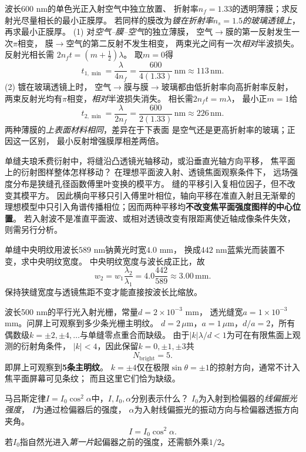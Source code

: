 \problemtext 波长$600$ nm的单色光正入射空气中独立放置、
折射率$n_f=1.33$的透明薄膜；求反射光尽量相长的最小正膜厚。
若同样的膜改为\emph{镀在折射率$n_s=1.5$的玻璃透镜上}，
再求最小正膜厚。
\workings
(1) 对\emph{空气--膜--空气}的独立薄膜，
空气$\to$膜的第一反射发生一次$\pi$相变，
膜$\to$空气的第二反射不发生相变，
两束光之间有一次\emph{相对}半波损失。
反射光相长需
$2n_ft=(m+\tfrac12)\lambda$。
取$m=0$得
\[
\boxed{t_{1,\min}=\frac{\lambda}{4n_f}
=\frac{600}{4(1.33)}\,\mathrm{nm}\approx113\,\mathrm{nm}}.
\]
(2) 镀在玻璃透镜上时，
空气$\to$膜与膜$\to$玻璃都由低折射率向高折射率反射，
两束反射光均有$\pi$相变，\emph{相对}半波损失消失。
相长需$2n_ft=m\lambda$，
最小正$m=1$给
\[
\boxed{t_{2,\min}=\frac{\lambda}{2n_f}
=\frac{600}{2(1.33)}\,\mathrm{nm}\approx226\,\mathrm{nm}}.
\]
\crosscheck 两种薄膜的\emph{上表面材料相同}，差异在于下表面
是空气还是更高折射率的玻璃；正因这一区别，
最小反射增强膜厚相差两倍。

\problemtext 单缝夫琅禾费衍射中，将缝沿凸透镜光轴移动，或沿垂直光轴方向平移，
焦平面上的衍射图样整体怎样移动？
\workings
在理想平面波入射、透镜焦面观察条件下，
远场强度分布是狭缝孔径函数傅里叶变换的模平方。
缝的平移引入复相位因子，但不改变其模平方。
因此横向平移只引入傅里叶相位，轴向平移在准直入射且无渐晕的理想模型中只引入角谱传播相位；因而两种平移均\textbf{不改变焦平面强度图样的中心位置}。
\crosscheck 若入射波不是准直平面波、或相对透镜改变有限距离使近轴成像条件失效，则需另行分析。

\problemtext 单缝中央明纹用波长$589$ nm钠黄光时宽$4.0$ mm，
换成$442$ nm蓝紫光而装置不变，求中央明纹宽度。
\workings
中央明纹宽度与波长成正比，故
\[
\boxed{w_2=w_1\frac{\lambda_2}{\lambda_1}
=4.0\frac{442}{589}\approx3.00\,\mathrm{mm}}.
\]
\crosscheck 保持狭缝宽度与透镜焦距不变才能直接按波长比缩放。

\problemtext 波长500 nm的平行光入射光栅，常量$d=2\times10^{-3}$ mm，
透光缝宽$a=1\times10^{-3}$ mm。问屏上可观察到多少条光栅主明纹。
\workings
$d=2\,\mu$m，$a=1\,\mu$m，$d/a=2$，所有偶数级$k=\pm2,\pm4,\ldots$与单缝零点重合而缺级。
由于$|k|\lambda/d<1$为可在有限焦面上观测的衍射角条件，
$|k|<4$，因此保留$k=0,\pm1,\pm3$共
\[
\boxed{N_{\mathrm{bright}}=5}.
\]
即屏上可观察到\textbf{5条主明纹}。
\crosscheck $k=\pm4$仅在极限$\sin\theta=\pm1$的掠射方向，通常不计入焦平面屏幕可见条纹；
而且这里它们恰为缺级。

\problemtext 马吕斯定律$I=I_0\cos^2\alpha$中，$I,I_0,\alpha$分别表示什么？
\workings
$I_0$为入射到检偏器的\emph{线偏振光强度}，
$I$为通过检偏器后的强度，
$\alpha$为入射线偏振光的振动方向与检偏器透振方向夹角。
\[
\boxed{I=I_0\cos^2\alpha}.
\]
\crosscheck 若$I_0$指自然光进入\emph{第一片}起偏器之前的强度，还需额外乘$1/2$。


